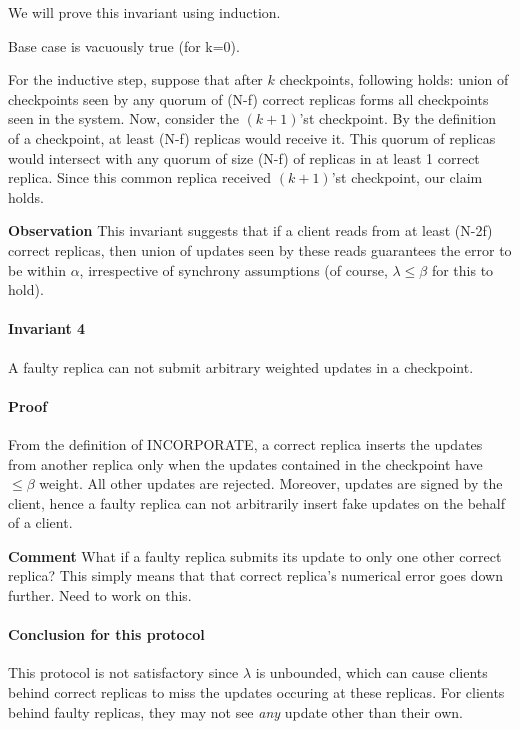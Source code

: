 \documentclass[letterpaper,twocolumn,10pt]{article}
\begin{document}
We will prove this invariant using induction.

Base case is vacuously true (for k=0).

For the inductive step, suppose that after $k$ checkpoints, following holds: 
union of checkpoints seen by any quorum of (N-f) correct replicas
forms all checkpoints seen in the system. Now,
consider the $(k+1)$'st checkpoint. By the definition of a 
checkpoint, at least (N-f) replicas would receive it.
This quorum of replicas would intersect with any quorum of size 
(N-f) of replicas in at least 1 correct replica.
Since this 
common replica received $(k+1)$'st checkpoint, our claim holds.

\textbf{Observation} This invariant suggests that if a client
reads from at least (N-2f) correct replicas, then union of updates
seen by these reads guarantees the error to be within $\alpha$,
irrespective of synchrony assumptions (of course, $\lambda\le\beta$
for this to hold).

\paragraph{Invariant 4} A faulty replica can not submit arbitrary
weighted updates in a checkpoint.

\paragraph{Proof} From the definition of INCORPORATE, a
correct replica inserts the updates from another replica only
when the updates contained in the checkpoint have $\le \beta$
weight. All other updates are rejected. Moreover, updates
are signed by the client, hence a faulty replica can not
arbitrarily insert fake updates on the behalf of a client.


\textbf{Comment} What if a faulty replica submits its update
to only one other correct replica? This simply means that 
that correct replica's numerical error goes down further.
Need to work on this.

\paragraph{Conclusion for this protocol} This protocol is not satisfactory
since $\lambda$ is unbounded, which can cause clients
behind correct replicas to miss the updates occuring at
these replicas. For clients behind faulty replicas, they
may not see \textit{any} update other than their own.
\end{document}
